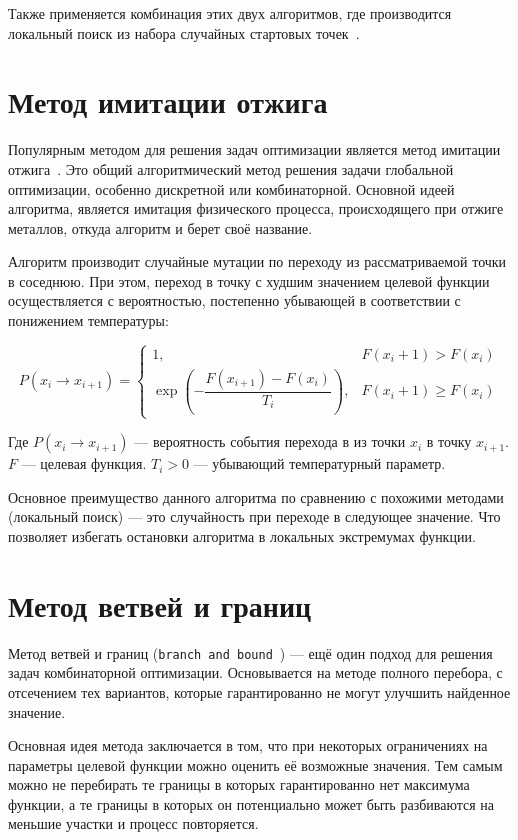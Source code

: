 Также применяется комбинация этих двух алгоритмов, где производится локальный
поиск из набора случайных стартовых точек~\cite{local}.

\section{Метод имитации отжига}

Популярным методом для решения задач оптимизации является метод имитации
отжига~\cite{od}. Это общий алгоритмический метод решения задачи глобальной
оптимизации, особенно дискретной или комбинаторной. Основной идеей алгоритма,
является имитация физического процесса, происходящего при отжиге металлов,
откуда алгоритм и берет своё название.

Алгоритм производит случайные мутации по переходу из рассматриваемой точки
в соседнюю. При этом, переход в точку с худшим значением целевой функции
осуществляется с вероятностью, постепенно убывающей в соответствии с понижением
температуры:

\[
P(x_i \to x_{i+1}) =
\begin{cases}
    1,                                                  & F(x_i+1) > F(x_i) \\
    \exp \left(-\dfrac{F(x_{i+1})-F(x_i)}{T_i}\right),  & F(x_i+1) \geqslant F(x_i)
\end{cases}
\]

Где $P(x_i \to x_{i+1})$ --- вероятность события перехода в из точки $x_i$
в точку $x_{i+1}$. $F$ --- целевая функция. $T_i > 0$ --- убывающий
температурный параметр.

Основное преимущество данного алгоритма по сравнению с похожими методами
(локальный поиск) --- это случайность при переходе в следующее значение. Что
позволяет избегать остановки алгоритма в локальных экстремумах функции.

\section{Метод ветвей и границ}

Метод ветвей и границ (\texttt{branch and bound}~\cite{branch}) --- ещё один
подход для решения задач комбинаторной оптимизации. Основывается на методе
полного перебора, с отсечением тех вариантов, которые гарантированно не могут
улучшить найденное значение.

Основная идея метода заключается в том, что при некоторых ограничениях на
параметры целевой функции можно оценить её возможные значения. Тем самым можно
не перебирать те границы в которых гарантированно нет максимума функции, а те
границы в которых он потенциально может быть разбиваются на меньшие участки
и процесс повторяется.

